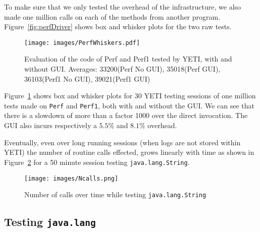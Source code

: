 To make sure that we only tested the overhead of the infrastructure, we also made one million calls on each of the methods from another program. Figure~\ref{fig:perfDriver} shows box and whisker plots for the two raw tests.

\begin{figure}[ht!]
\begin{center}
\texttt{[image: images/PerfWhiskers.pdf]}
\end{center}
\caption{Evaluation of the code of Perf and Perf1 tested by YETI, with and without GUI. Averages: 33200(Perf No GUI), 35018(Perf GUI), 36103(Perf1 No GUI), 39021(Perf1 GUI)}\label{fig:perfValue}
\end{figure}

Figure~\ref{fig:perfValue} shows box and whisker plots for 30 YETI testing sessions of one million tests made on \texttt{Perf} and \texttt{Perf1}, both with and without the GUI. We can see that there is a slowdown of more than a factor 1000 over the direct invocation. The GUI also incurs respectively a $5.5\%$ and $8.1\%$ overhead.

Eventually, even over long running sessions (when logs are not stored within YETI) the number of routine calls effected, grows linearly with time as shown in Figure~\ref{fig:string} for a 50 minute session testing \texttt{java.lang.String}.

\begin{figure}[h!]
\begin{center}
\texttt{[image: images/Ncalls.png]}
\end{center}
\caption{Number of calls over time while testing \texttt{java.lang.String}}\label{fig:string}
\end{figure}



\subsection{Testing \texttt{java.lang}}

